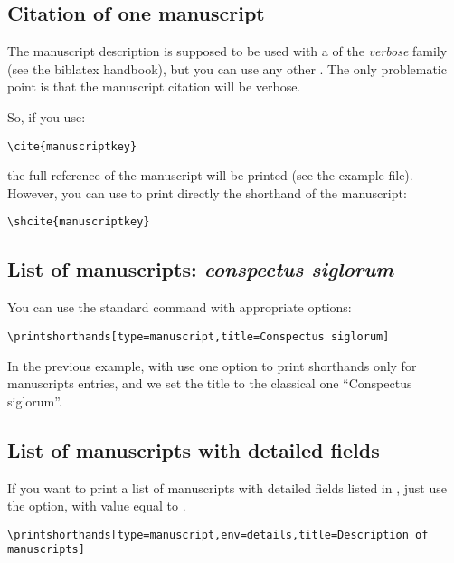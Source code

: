 \documentclass{ltxdockit}[2011/03/25]
\newcommand{\biblatex}{biblatex\xspace}
\begin{document}
\subsection{Citation of one manuscript}

The manuscript description is supposed to be used with a  of the \emph{verbose} family (see the \biblatex handbook), but you can use any other . The only problematic point is that the manuscript citation will be verbose.

So, if you use:
\begin{verbatim}
\cite{manuscriptkey}
\end{verbatim}

the full reference of the manuscript will be printed (see the example file). However, you can use  to print directly the shorthand of the manuscript:

\begin{verbatim}
\shcite{manuscriptkey}
\end{verbatim}

\subsection{List of manuscripts: \emph{conspectus siglorum}}

You can use the standard command  with appropriate options:

\begin{verbatim}
\printshorthands[type=manuscript,title=Conspectus siglorum]
\end{verbatim}

In the previous example, with use one option to print shorthands only for manuscripts entries, and we set the title to the classical one \enquote{Conspectus siglorum}.

\subsection{List of manuscripts with detailed fields}

If you want to print a list of manuscripts with detailed fields listed in , just use the  option, with value equal to
.

\begin{verbatim}
\printshorthands[type=manuscript,env=details,title=Description of manuscripts]
\end{verbatim}
\end{document}
